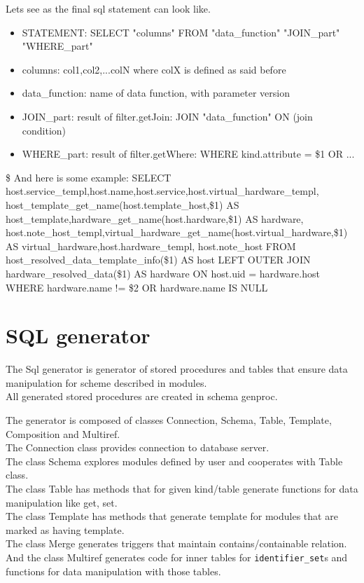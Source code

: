\documentclass[deska]{subfiles}
\begin{document}
Lets see as the final sql statement can look like.
\begin{itemize}
\item{STATEMENT}: SELECT "columns" FROM "data\_function" "JOIN\_part" "WHERE\_part"
\item{columns}: col1,col2,...colN where colX is defined as said before
\item{data\_function}: name of data function, with parameter version
\item{JOIN\_part}: result of filter.getJoin: JOIN "data\_function" ON (join condition)
\item{WHERE\_part}: result of filter.getWhere: WHERE kind.attribute = \$1 OR ...
\end{itemize}\$
And here is some example:
SELECT host.service\_templ,host.name,host.service,host.virtual\_hardware\_templ,
host\_template\_get\_name(host.template\_host,\$1) AS host\_template,hardware\_get\_name(host.hardware,\$1) AS hardware,
host.note\_host\_templ,virtual\_hardware\_get\_name(host.virtual\_hardware,\$1) AS virtual\_hardware,host.hardware\_templ,
host.note\_host FROM host\_resolved\_data\_template\_info(\$1) AS host
LEFT OUTER JOIN hardware\_resolved\_data(\$1) AS hardware ON host.uid = hardware.host
WHERE hardware.name != \$2 OR hardware.name IS NULL 

\section{SQL generator}
\label{sec:objects-and-relations}

The Sql generator is generator of stored procedures and tables that ensure data manipulation for scheme described in modules.\\
All generated stored procedures are created in schema genproc.

The generator is composed of classes Connection, Schema, Table, Template, Composition and Multiref.\\
The Connection class provides connection to database server.\\
The class Schema explores modules defined by user and cooperates with Table class.\\
The class Table has methods that for given kind/table generate functions for data manipulation like get, set.\\
The class Template has methods that generate template for modules that are marked as having template.\\
The class Merge generates triggers that maintain contains/containable relation.\\
And the class Multiref generates code for inner tables for {\tt identifier\_set}s and functions for data manipulation with those tables.\\
\end{document}
